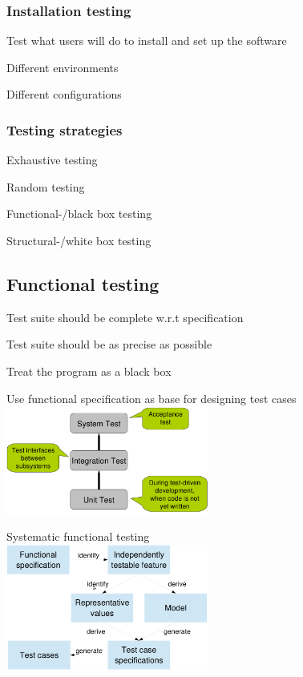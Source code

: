 \documentclass[10pt]{article}
\begin{document}
\subsubsection{Installation testing}
\enumstart
	\item Test what users will do to install and set up the software
	\item Different environments
	\item Different configurations
\enumend

\subsubsection{Testing strategies}
\enumstart
	\item Exhaustive testing
	\item Random testing
	\item Functional-/black box testing
	\item Structural-/white box testing
\enumend

\subsection{Functional testing}
\enumstart
	\item Test suite should be complete w.r.t specification
	\item Test suite should be as precise as possible
	\item Treat the program as a black box
	\item Use functional specification as base for designing test cases
	\\ \includegraphics[width=0.5\textwidth]{functional_testing.png}
	\item Systematic functional testing
	\\ \includegraphics[width=0.5\textwidth]{systematic_functional_testing.png}
\enumend
\end{document}
